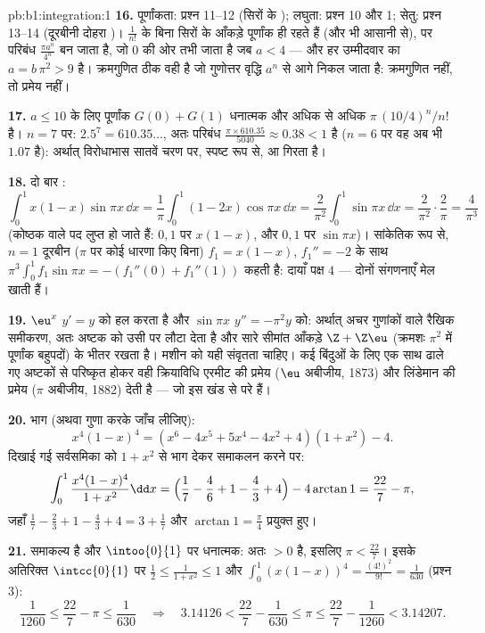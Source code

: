 \begin{solution}{pb:b1:integration:1}
\textbf{16.} पूर्णांकता: प्रश्न 11--12 (सिरों के ); लघुता: प्रश्न 10 और
1; सेतु: प्रश्न 13--14 (दूरबीनी दोहरा )। $\frac{1}{n!}$ के बिना
सिरों के आँकड़े पूर्णांक ही रहते हैं (और भी आसानी से), पर परिबंध $\frac{\pi
a^n}{4^n}$ बन जाता है, जो $0$ की ओर तभी जाता है जब $a < 4$ --- और हर
उम्मीदवार का $a = b\,\pi^2 > 9$ है। क्रमगुणित ठीक वही है जो गुणोत्तर वृद्धि
$a^n$ से आगे निकल जाता है: क्रमगुणित नहीं, तो प्रमेय नहीं।

\textbf{17.} $a \leq 10$ के लिए पूर्णांक $G(0) + G(1)$ धनात्मक और अधिक से
अधिक $\pi\,(10/4)^n/n!$ है। $n = 7$ पर: $2.5^7 = 610.35\dots$, अतः परिबंध
$\frac{\pi \times 610.35}{5040} \approx 0.38 < 1$ है ($n = 6$ पर वह अब भी
$1.07$ है): अर्थात् विरोधाभास सातवें चरण पर, स्पष्ट रूप से, आ गिरता है।

\textbf{18.} दो बार :
\[
\int_0^1 x(1-x)\sin\pi x\,\dd x
= \frac1\pi\int_0^1 (1 - 2x)\cos\pi x\,\dd x
= \frac{2}{\pi^2}\int_0^1 \sin\pi x\,\dd x
= \frac{2}{\pi^2}\cdot\frac{2}{\pi} = \frac{4}{\pi^3}
\]
(कोष्ठक वाले पद लुप्त हो जाते हैं: $0, 1$ पर $x(1-x)$, और $0, 1$ पर $\sin\pi
x$)। सांकेतिक रूप से, $n = 1$ दूरबीन ($\pi$ पर कोई धारणा किए बिना) $f_1 =
x(1 - x)$, $f_1'' = -2$ के साथ $\pi^3\int_0^1 f_1\sin\pi x = -(f_1''(0) +
f_1''(1))$ कहती है: दायाँ पक्ष $4$ --- दोनों संगणनाएँ मेल खाती हैं।

\textbf{19.} $\eu^x$ $y' = y$ को हल करता है और $\sin\pi x$ $y'' = -\pi^2 y$
को: अर्थात् अचर गुणांकों वाले रैखिक समीकरण, अतः  अष्टक को उसी पर
लौटा देता है और सारे सीमांत आँकड़े $\Z + \Z\eu$ (क्रमशः $\pi^2$ में पूर्णांक
बहुपदों) के भीतर रखता है। मशीन को यही संवृतता चाहिए। कई बिंदुओं के लिए एक
साथ ढाले गए अष्टकों से परिष्कृत होकर वही क्रियाविधि एरमीट की प्रमेय ($\eu$
अबीजीय, 1873) और लिंडेमान की प्रमेय ($\pi$ अबीजीय, 1882) देती है --- जो इस
खंड से परे हैं।

\textbf{20.}  भाग (अथवा गुणा करके जाँच लीजिए):
\[
x^4(1-x)^4 = (x^6 - 4x^5 + 5x^4 - 4x^2 + 4)(1 + x^2) - 4 .
\]
दिखाई गई सर्वसमिका को $1 + x^2$ से भाग देकर समाकलन करने पर:
\[
\int_0^1 \frac{x^4(1-x)^4}{1+x^2}\dd x
= \Bigl(\frac17 - \frac46 + 1 - \frac43 + 4\Bigr)
- 4\arctan 1
= \frac{22}{7} - \pi ,
\]
जहाँ $\frac17 - \frac23 + 1 - \frac43 + 4 = 3 + \frac17$ और $\arctan 1 =
\frac\pi4$ प्रयुक्त हुए।

\textbf{21.} समाकल्य  है और $\intoo{0}{1}$ पर धनात्मक: अतः  $> 0$
है, इसलिए $\pi < \frac{22}{7}$। इसके अतिरिक्त $\intcc{0}{1}$ पर $\frac12
\leq \frac{1}{1+x^2} \leq 1$ और $\int_0^1 (x(1-x))^4 = \frac{(4!)^2}{9!} =
\frac{1}{630}$ (प्रश्न 3):
\[
\frac{1}{1260} \leq \frac{22}{7} - \pi \leq \frac{1}{630}
\quad\Longrightarrow\quad
3.14126 < \frac{22}{7} - \frac{1}{630} \leq \pi \leq
\frac{22}{7} - \frac{1}{1260} < 3.14207 .
\]


\end{solution}

